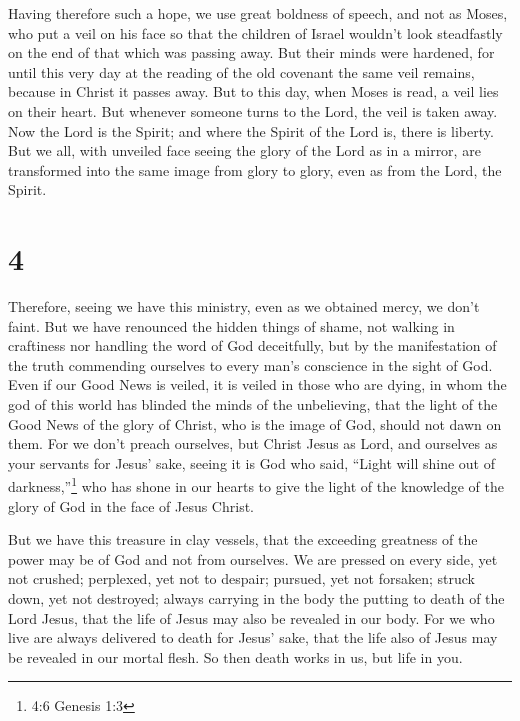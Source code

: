  Having therefore such a hope, we use great boldness of
speech,  and not as Moses, who put a veil on his face so
that the children of Israel wouldn't look steadfastly on the end of that
which was passing away.  But their minds were hardened, for
until this very day at the reading of the old covenant the same veil
remains, because in Christ it passes away.  But to this
day, when Moses is read, a veil lies on their heart.  But
whenever someone turns to the Lord, the veil is taken away.
 Now the Lord is the Spirit; and where the Spirit of the
Lord is, there is liberty.  But we all, with unveiled face
seeing the glory of the Lord as in a mirror, are transformed into the
same image from glory to glory, even as from the Lord, the Spirit.

\hypertarget{section-3}{%
\section{4}\label{section-3}}

 Therefore, seeing we have this ministry, even as we
obtained mercy, we don't faint.  But we have renounced the
hidden things of shame, not walking in craftiness nor handling the word
of God deceitfully, but by the manifestation of the truth commending
ourselves to every man's conscience in the sight of God. 
Even if our Good News is veiled, it is veiled in those who are dying,
 in whom the god of this world has blinded the minds of the
unbelieving, that the light of the Good News of the glory of Christ, who
is the image of God, should not dawn on them.  For we don't
preach ourselves, but Christ Jesus as Lord, and ourselves as your
servants for Jesus' sake,  seeing it is God who said,
``Light will shine out of darkness,''\footnote{4:6 Genesis 1:3} who has
shone in our hearts to give the light of the knowledge of the glory of
God in the face of Jesus Christ.

 But we have this treasure in clay vessels, that the
exceeding greatness of the power may be of God and not from ourselves.
 We are pressed on every side, yet not crushed; perplexed,
yet not to despair;  pursued, yet not forsaken; struck down,
yet not destroyed;  always carrying in the body the putting
to death of the Lord Jesus, that the life of Jesus may also be revealed
in our body.  For we who live are always delivered to death
for Jesus' sake, that the life also of Jesus may be revealed in our
mortal flesh.  So then death works in us, but life in you.

